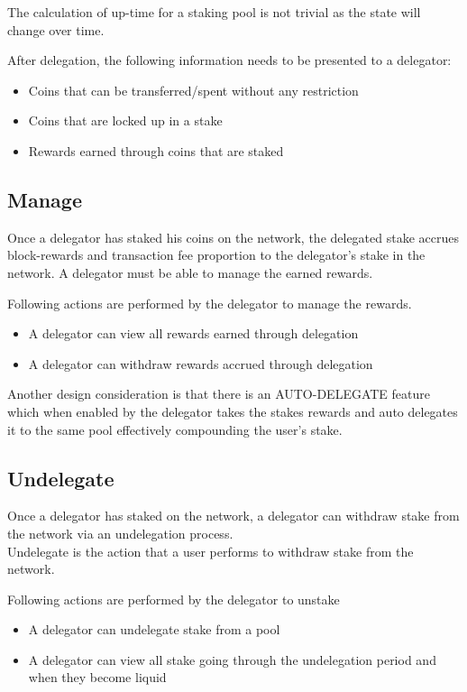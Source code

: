 The calculation of up-time for a staking pool is not trivial as the state will change over time. 

After delegation, the following information needs to be presented to a delegator:
 \begin{itemize}
     \item Coins that can be transferred/spent without any restriction 
     \item Coins that are locked up in a stake 
     \item Rewards earned through coins that are staked 
 \end{itemize}


\subsection{Manage}
Once a delegator has staked his coins on the network, the delegated stake accrues block-rewards and transaction fee proportion to the delegator's stake in the network. A delegator must be able to manage the earned rewards.

Following actions are performed by the delegator to manage the rewards.
  \begin{itemize}
      \item A delegator can view all rewards earned through delegation 
      \item A delegator can withdraw rewards accrued through delegation 
  \end{itemize}
  
Another design consideration is that there is an AUTO-DELEGATE feature which when enabled by the delegator takes the stakes rewards and auto delegates it to the same pool effectively compounding the user's stake.


\subsection{Undelegate} 
Once a delegator has staked on the network, a delegator can withdraw stake from the network via an undelegation process.\\


Undelegate is the action that a user performs to withdraw stake from the network. 

Following actions are performed by the delegator to unstake 
 \begin{itemize}
      \item A delegator can undelegate stake from a pool
      \item A delegator can view all stake going through the undelegation period and when they become liquid
  \end{itemize}
  
